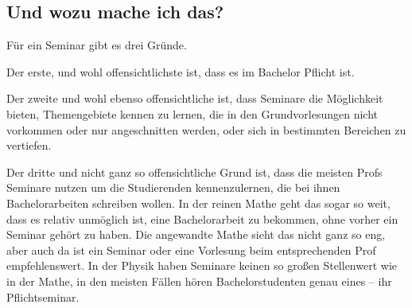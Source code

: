 \subsection{Und wozu mache ich das?}
Für ein Seminar gibt es drei Gründe.

Der erste, und wohl offensichtlichste ist, dass es im Bachelor Pflicht ist.

Der zweite und wohl ebenso offensichtliche ist, dass Seminare die Möglichkeit bieten, Themengebiete kennen zu lernen, die in den Grundvorlesungen nicht vorkommen oder nur angeschnitten werden, oder sich in bestimmten Bereichen zu vertiefen.

Der dritte und nicht ganz so offensichtliche Grund ist, dass die meisten Profs Seminare nutzen um die Studierenden kennenzulernen, die bei ihnen Bachelorarbeiten schreiben wollen. In der reinen Mathe geht das sogar so weit, dass es relativ unmöglich ist, eine Bachelorarbeit zu bekommen, ohne vorher ein Seminar gehört zu haben. Die angewandte Mathe sieht das nicht ganz so eng, aber auch da ist ein Seminar oder eine Vorlesung beim entsprechenden Prof empfehlenswert. In der Physik haben Seminare keinen so großen Stellenwert wie in der Mathe, in den meisten Fällen hören Bachelorstudenten genau eines -- ihr Pflichtseminar.
